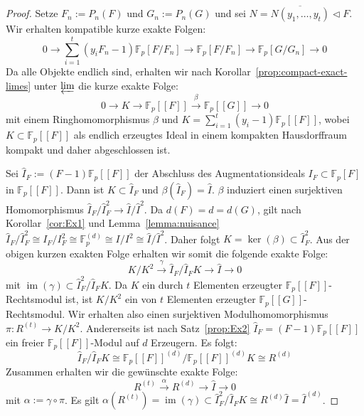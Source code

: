 \documentclass[11pt,a4paper,openany]{memoir}
\begin{document}
\begin{proof}
Setze $F_n:=P_n(F)$ und $G_n:=P_n(G)$ und sei $N=\overline{N(y_1,\ldots,y_t)}\lhd F$. Wir erhalten kompatible kurze exakte Folgen:
\[ 0\to\sum_{i=1}^t(y_iF_n-1)\mathbb{F}_p[F/F_n]\to \mathbb{F}_p[F/F_n]\to\mathbb{F}_p[G/G_n]\to 0 \]
Da alle Objekte endlich sind, erhalten wir nach Korollar~\ref{prop:compact-exact-limes} unter $\varprojlim$ die kurze exakte Folge:
\[0\to K\to \mathbb{F}_p[[F]]\stackrel{\beta}{\to} \mathbb{F}_p[[G]]\to 0 \]
mit einem Ringhomomorphismus $\beta$ und $K=\sum_{i=1}^t (y_i-1)\mathbb{F}_p[[F]]$, wobei $K\subset\mathbb{F}_p[[F]]$ als endlich erzeugtes Ideal in einem kompakten Hausdorffraum kompakt und daher abgeschlossen ist.

Sei $\widehat{I}_F:=(F-1)\mathbb{F}_p[[F]]$ der Abschluss des Augmentationsideals $I_F\subset\mathbb{F}_p[F]$ in $\mathbb{F}_p[[F]]$. Dann ist $K\subset \widehat{I}_F$ und $\beta(\widehat{I}_F)=\widehat{I}$. $\beta$ induziert einen surjektiven Homomorphismus $\widehat{I}_F/\widehat{I}_F^2\to \widehat{I}/\widehat{I}^2$. Da $d(F)=d=d(G)$, gilt nach Korollar~\ref{cor:Ex1} und Lemma~\ref{lemma:nuisance} $\widehat{I}_F/\widehat{I}_F^2\cong I_F/I_F^2\cong \mathbb{F}_p^{(d)}\cong I/I^2\cong \widehat{I}/\widehat{I}^2$. Daher folgt $K=\ker(\beta)\subset \widehat{I}_F^2$. Aus der obigen kurzen exakten Folge erhalten wir somit die folgende exakte Folge:
\[ K/K^2\stackrel{\gamma}{\to}\widehat{I}_F/\widehat{I}_FK\to \widehat{I}\to 0 \]
mit $\operatorname{im}(\gamma)\subset\widehat{I}_F^2/\widehat{I}_FK$. Da $K$ ein durch $t$ Elementen erzeugter $\mathbb{F}_p[[F]]$-Rechtsmodul ist, ist $K/K^2$ ein von $t$ Elementen erzeugter $\mathbb{F}_p[[G]]$-Rechtsmodul. Wir erhalten also einen surjektiven Mo\-dul\-ho\-mo\-mor\-phis\-mus $\pi:R^{(t)}\to K/K^2$. Andererseits ist nach Satz~\ref{prop:Ex2} $\widehat{I}_F=(F-1)\mathbb{F}_p[[F]]$ ein freier $\mathbb{F}_p[[F]]$-Modul auf $d$ Erzeugern. Es folgt:
\[\widehat{I}_F/\widehat{I}_FK\cong \mathbb{F}_p[[F]]^{(d)}/\mathbb{F}_p[[F]]^{(d)}K\cong R^{(d)} \]
Zusammen erhalten wir die gewünschte exakte Folge:
\[R^{(t)}\stackrel{\alpha}{\to}R^{(d)}\to \widehat{I}\to 0 \]
mit $\alpha:=\gamma\circ\pi$. Es gilt $\alpha(R^{(t)})=\operatorname{im}(\gamma)\subset\widehat{I}^2_F/\widehat{I}_FK\cong R^{(d)}\widehat{I}=\widehat{I}^{(d)}$.
\end{proof}
\end{document}
